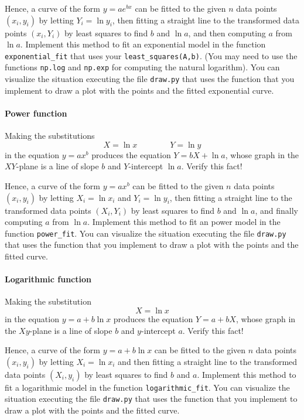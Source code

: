 \documentclass[a4paper,10pt]{article}
\begin{document}
Hence, a curve of the form $y=ae^{bx}$ can be fitted to the given $n$ data
points $(x_i,y_i)$ by letting $Y_i=\ln y_i$, then fitting a straight
line to the transformed data points $(x_i,Y_i)$ by least squares to find
$b$ and $\ln a$, and then computing $a$ from $\ln a$.  Implement this
method to fit an exponential model in the function
\lstinline{exponential_fit} that uses your
\lstinline{least_squares(A,b)}. (You may need to use the functions
\lstinline{np.log} and \lstinline{np.exp} for computing the natural
logarithm). You can visualize the situation executing the file
\lstinline{draw.py} that uses the function that you implement to draw a
plot with the points and the fitted exponential curve.

\paragraph{Power function}
Making the substitutions \[X=\ln x\qquad \qquad Y=\ln y\] in the
equation $y=ax^b$ produces the equation $Y=bX+\ln a$, whose graph in the
$XY$-plane is a line of slope $b$ and $Y$-intercept $\ln a$.  Verify
this fact!

Hence, a curve of the form $y=ax^b$ can be fitted to the given $n$ data
points $(x_i,y_i)$ by letting $X_i=\ln x_i$ and $Y_i=\ln y_i$, then
fitting a straight line to the transformed data points $(X_i,Y_i)$ by
least squares to find $b$ and $\ln a$, and finally computing $a$ from $\ln
a$.  Implement this method to fit an power model in the function
\lstinline{power_fit}. You can visualize the situation executing the
file \lstinline{draw.py} that uses the function that you implement to
draw a plot with the points and the fitted curve.


\paragraph{Logarithmic function} Making the substitution \[X=\ln x\]
in the equation $y=a+b\ln x$ produces the equation $Y=a+bX$, whose
graph in the $Xy$-plane is a line of slope $b$ and $y$-intercept
$a$. Verify this fact!

Hence, a curve of the form $y=a+b\ln x$ can be fitted to the given $n$ data
points $(x_i,y_i)$ by letting $X_i=\ln x_i$ and then fitting a straight
line to the transformed data points $(X_i,y_i)$ by least squares to find
$b$ and $a$.  Implement this
method to fit a logarithmic model in the function
\lstinline{logarithmic_fit}. You can visualize the situation executing
the file \lstinline{draw.py} that uses the function that you implement
to draw a plot with the points and the fitted curve.
\end{document}
